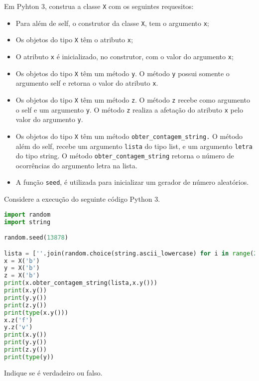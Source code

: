 \documentclass[12pt,varwidth=16cm,border=17pt]{standalone}
\begin{document}
Em Pyhton 3, construa a classe \verb+X+ com os seguintes requesitos:

\begin{itemize}

  \item Para além de self, o construtor da classe \verb+X+, tem o argumento \verb+x+;
  \item Os objetos do tipo \verb+X+ têm o atributo \verb+x+;
  \item O atributo \verb+x+ é inicializado, no construtor, com o valor
	do argumento \verb+x+;
  \item Os objetos do tipo \verb+X+ têm um método \verb+y+. O
    método \verb+y+ possui somente o argumento self e retorna o valor do atributo \verb+x+.
	
  \item Os objetos do tipo \verb+X+ têm um método \verb+z+. O
    método \verb+z+ recebe como argumento o self e um argumento \verb+y+. 
	O método \verb+z+ realiza a afetação do atributo \verb+x+ pelo valor do argumento \verb+y+.
    
 \item Os objetos do tipo \verb+X+ têm um método \verb+obter_contagem_string.+ O
    método além do self, recebe um argumento \verb+lista+ do tipo list, e um argumento \verb+letra+ do tipo string. O método \verb+obter_contagem_string+ retorna o número de ocorrências do argumento letra na lista.
    
 \item A função \verb+seed+, é utilizada para inicializar um gerador de número aleatórios.
    
\end{itemize}

Considere a execução do seguinte código Python 3.






\begin{lstlisting}[language=Python]
import random
import string

random.seed(13878)

lista = [''.join(random.choice(string.ascii_lowercase) for i in range(2)) for i in range(300)]
x = X('b')
y = X('b')
z = X('b')
print(x.obter_contagem_string(lista,x.y()))
print(x.y())
print(y.y())
print(z.y())
print(type(x.y()))
x.z('f')
y.z('v')
print(x.y())
print(y.y())
print(z.y())
print(type(y))
\end{lstlisting}

Indique se é verdadeiro ou falso.
\end{document}
